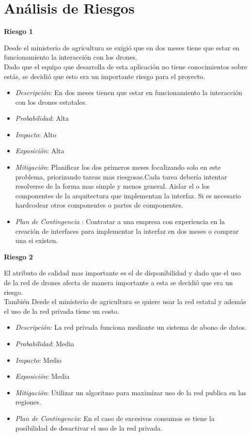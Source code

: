 \section{Análisis de Riesgos}
\textbf{Riesgo 1}

Desde el ministerio de agricultura se exigi\'o que en dos meses tiene que estar en funcionamiento la interacci\'on con los drones.\\
Dado que el equipo que desarrolla de esta aplicaci\'on no tiene conocimientos sobre est\'as, se decidi\'o que esto era un importante riesgo para el proyecto.

\begin{itemize}
\item \textsl{Descripci\'on}: En dos meses tienen que estar en funcionamiento la interacción con los drones estatales.
 \item \textsl{Probabilidad}: Alta
 \item \textsl{Impacto}: Alto
 \item \textsl{Exposición}: Alta
 \item \textsl{Mitigación}: Planificar los dos primeros meses focalizando solo en este problema, priorizando tareas mas riesgosas.Cada tarea deber\'ia intentar resolverse de la forma mas simple y menos general. Aislar el o los  componentes de la arquitectura que implementan la interfaz. Si es necesario hardcodear otros componentes o partes de componentes.
 \item \textsl{Plan de Contingencia} : Contratar a una empresa con experiencia en la creaci\'on de interfaces para implementar la interfaz en dos meses o comprar una si existen.
 \end{itemize}
 
\textbf{Riesgo 2}

 El atributo de calidad mas importante es el de disponibilidad y dado que el uso de la red de drones afecta de manera importante a esta se decidi\'o que era un riesgo.\\
 Tambi\'en Desde el ministerio de agricultura se quiere usar la red estatal y adem\'as el uso de la red privada tiene un costo.
 
 \begin{itemize}
 \item \textsl{Descripci\'on}: La red privada funciona mediante un sistema de abono de datos.
 \item \textsl{Probabilidad}: Media
 \item \textsl{Impacto}: Medio
 \item \textsl{Exposición}: Media
 \item \textsl{Mitigación}: Utilizar un algoritmo para maximizar uso de la red publica en las regiones.
 \item \textsl{Plan de Contingencia}: En el caso de excesivos consumos se tiene la posibilidad de desactivar el uso de la red privada.
\end{itemize}

